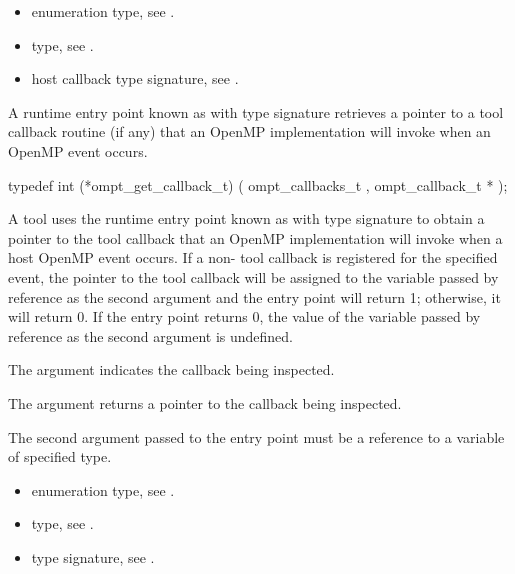 \crossreferences
\begin{itemize}
\item {} enumeration type, see .
\item {} type, see .
\item {} host callback type signature,
see .
\end{itemize}

\label{sec:ompt_get_callback_t}
\label{sec:ompt_get_callback}

\summary

A runtime entry point known as 
with type signature  retrieves a pointer
to a tool callback routine (if any)
that an OpenMP implementation will invoke when an OpenMP event occurs.

\format

\begin{ccppspecific}
\begin{omptCallback}
typedef int (*ompt_get_callback_t) (
  ompt_callbacks_t ,
  ompt_callback_t *
);
\end{omptCallback}
\end{ccppspecific}


\descr
A tool uses the runtime entry point known
as 
with type signature 
to obtain a pointer to the tool callback that
an OpenMP implementation will invoke when a host OpenMP event occurs.
If a non- tool callback is registered for the specified event,
the pointer to the tool callback will be assigned to the variable
passed by reference as the second argument and the entry
point will return 1; otherwise, it will return 0. If the entry point
returns 0, the value of the variable passed by reference as the second
argument is undefined.

\argdesc

The argument  indicates the callback being inspected.

The argument  returns a pointer to the callback being inspected.

\constraints
The second argument passed to the entry point must be a reference
to a variable of specified type.

\crossreferences
\begin{itemize}
\item {} enumeration type, see .
\item {} type, see .
\item {} type signature,
see .
\end{itemize}


